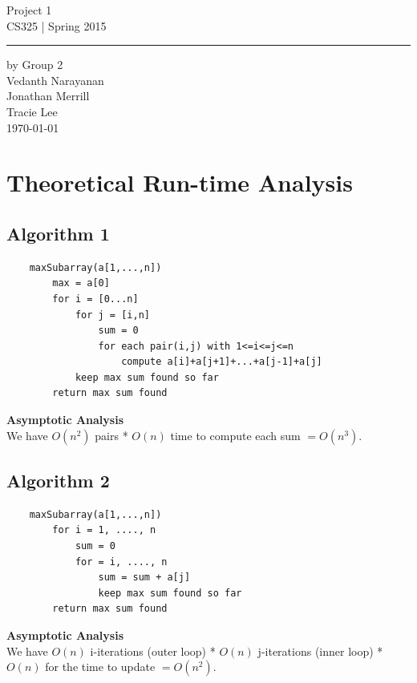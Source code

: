\documentclass[11pt,letterpaper]{article}
\begin{document}
\begin{titlepage}
    \vspace*{4cm}
    \begin{flushright}
    {\huge
        Project 1\\[5mm]
    }
    {\large
        CS325 | Spring 2015
     }
    \end{flushright}
\hrule
    \begin{flushright}
	by Group 2\\
	Vedanth Narayanan\\
	Jonathan Merrill\\
	Tracie Lee\\
    \vfill
	\today\\
    \end{flushright}
\end{titlepage}

\raggedright

\section{Theoretical Run-time Analysis}

\subsection{Algorithm 1}
\begin{verbatim}
    maxSubarray(a[1,...,n])
        max = a[0]
        for i = [0...n]
            for j = [i,n]
                sum = 0
                for each pair(i,j) with 1<=i<=j<=n
        	        compute a[i]+a[j+1]+...+a[j-1]+a[j]
            keep max sum found so far
        return max sum found
\end{verbatim}
\textbf{Asymptotic Analysis}\\
We have $O(n^2)$ pairs * $O(n)$ time to compute each sum $= O(n^3)$.

\subsection{Algorithm 2}
\begin{verbatim}
    maxSubarray(a[1,...,n])
        for i = 1, ...., n
            sum = 0
            for = i, ...., n
                sum = sum + a[j]
                keep max sum found so far
        return max sum found
\end{verbatim}
\textbf{Asymptotic Analysis}\\
We have $O(n)$ i-iterations (outer loop) * $O(n)$ j-iterations (inner loop) * $O(n)$ for the time to update $= O(n^2)$.
\end{document}
